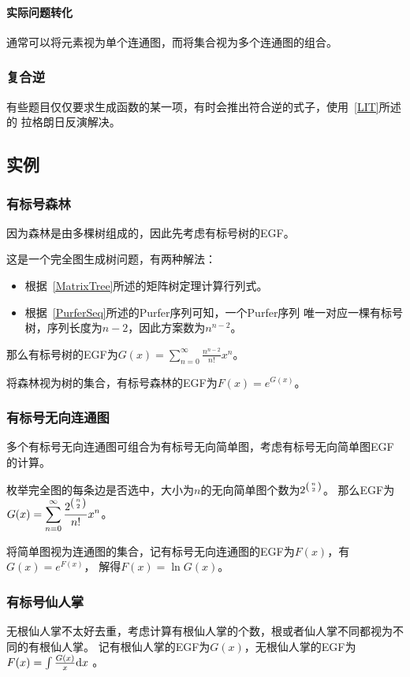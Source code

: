 \paragraph{实际问题转化}
通常可以将元素视为单个连通图，而将集合视为多个连通图的组合。
\subsubsection{复合逆}
有些题目仅仅要求生成函数的某一项，有时会推出符合逆的式子，使用~\ref{LIT}所述的
拉格朗日反演解决。
\subsection{实例}
\subsubsection{有标号森林}
因为森林是由多棵树组成的，因此先考虑有标号树的EGF。

这是一个完全图生成树问题，有两种解法：
\begin{itemize}
    \item 根据~\ref{MatrixTree}所述的矩阵树定理计算行列式。
    \item 根据~\ref{PurferSeq}所述的Purfer序列可知，一个Purfer序列
    唯一对应一棵有标号树，序列长度为$n-2$，因此方案数为$n^{n-2}$。
\end{itemize}

那么有标号树的EGF为$G(x)=\displaystyle \sum_{n=0}^\infty{\frac{n^{n-2}}{n!}x^n}$。

将森林视为树的集合，有标号森林的EGF为$F(x)=e^{G(x)}$。
\subsubsection{有标号无向连通图}
多个有标号无向连通图可组合为有标号无向简单图，考虑有标号无向简单图EGF的计算。

枚举完全图的每条边是否选中，大小为$n$的无向简单图个数为$2^{\left(n \atop 2\right)}$。
那么EGF为$G(x)=\displaystyle \sum_{n=0}^\infty{\frac{2^{\left(n \atop 2\right)}}{n!}x^n}$。

将简单图视为连通图的集合，记有标号无向连通图的EGF为$F(x)$，有$G(x)=e^{F(x)}$，
解得$F(x)=\ln G(x)$。
\subsubsection{有标号仙人掌}
无根仙人掌不太好去重，考虑计算有根仙人掌的个数，根或者仙人掌不同都视为不同的有根仙人掌。
记有根仙人掌的EGF为$G(x)$，无根仙人掌的EGF为$F(x)=\int \frac{G(x)}{x} \textrm{d} x$
。

